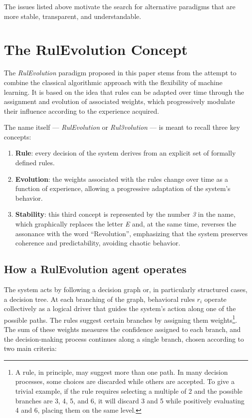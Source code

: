 \documentclass[12pt,a4paper]{article}
\begin{document}
The issues listed above motivate the search for alternative paradigms that are more stable, transparent, and understandable.


\section{The RulEvolution Concept}
The \textit{RulEvolution} paradigm proposed in this paper stems from the attempt to combine the classical algorithmic approach with the flexibility of machine learning. 
It is based on the idea that rules can be adapted over time through the assignment and evolution of associated weights, which progressively modulate their influence according to the experience acquired. 

The name itself — \textit{RulEvolution} or \textit{Rul3volution} — is meant to recall three key concepts:
\begin{enumerate}
\item \textbf{Rule}: every decision of the system derives from an explicit set of formally defined rules.
\item \textbf{Evolution}: the weights associated with the rules change over time as a function of experience, allowing a progressive adaptation of the system’s behavior.
\item \textbf{Stability}: this third concept is represented by the number \textit{3} in the name, which graphically replaces the letter \textit{E} and, at the same time, reverses the assonance with the word “Revolution”, emphasizing that the system preserves coherence and predictability, avoiding chaotic behavior.
\end{enumerate}

\subsection{How a RulEvolution agent operates}
The system acts by following a decision graph or, in particularly structured cases, a decision tree.  
At each branching of the graph, behavioral rules $r_i$ operate collectively as a logical driver that guides the system’s action along one of the possible paths.  
The rules suggest certain branches by assigning them weights\footnote{A rule, in principle, may suggest more than one path. In many decision processes, some choices are discarded while others are accepted. To give a trivial example, if the rule requires selecting a multiple of 2 and the possible branches are 3, 4, 5, and 6, it will discard 3 and 5 while positively evaluating 4 and 6, placing them on the same level.}.  
The sum of these weights measures the confidence assigned to each branch, and the decision-making process continues along a single branch, chosen according to two main criteria:
\end{document}
